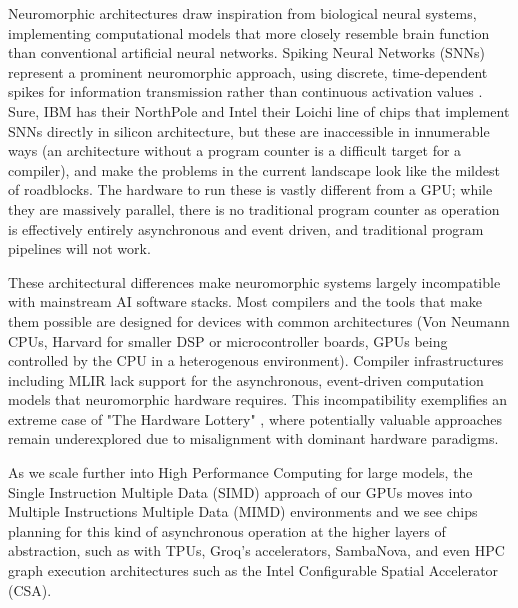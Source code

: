 \documentclass[manuscript,screen,review,format=acmsmall]{acmart}
\begin{document}
Neuromorphic architectures draw inspiration from biological neural systems, implementing computational models that more closely resemble brain function than conventional artificial neural networks. Spiking Neural Networks (SNNs) represent a prominent neuromorphic approach, using discrete, time-dependent spikes for information transmission rather than continuous activation values \cite{10.1145/3571155}. Sure, IBM has their NorthPole and Intel their Loichi line of chips that implement SNNs directly in silicon architecture, but these are inaccessible in innumerable ways (an architecture without a program counter is a difficult target for a compiler), and make the problems in the current landscape look like the mildest of roadblocks. The hardware to run these is vastly different from a GPU; while they are massively parallel, there is no traditional program counter as operation is effectively entirely asynchronous and event driven, and traditional program pipelines will not work.

These architectural differences make neuromorphic systems largely incompatible with mainstream AI software stacks. Most compilers and the tools that make them possible are designed for devices with common architectures (Von Neumann CPUs, Harvard for smaller DSP or microcontroller boards, GPUs being controlled by the CPU in a heterogenous environment). Compiler infrastructures including MLIR lack support for the asynchronous, event-driven computation models that neuromorphic hardware requires. This incompatibility exemplifies an extreme case of "The Hardware Lottery" \cite{TheHardwareLottery}, where potentially valuable approaches remain underexplored due to misalignment with dominant hardware paradigms.











As we scale further into High Performance Computing for large models, the Single Instruction Multiple Data (SIMD) approach of our GPUs moves into Multiple Instructions Multiple Data (MIMD) environments and we see chips planning for this kind of asynchronous operation at the higher layers of abstraction, such as with TPUs, Groq's accelerators, SambaNova, and even HPC graph execution architectures such as the Intel Configurable Spatial Accelerator (CSA).






\end{document}
